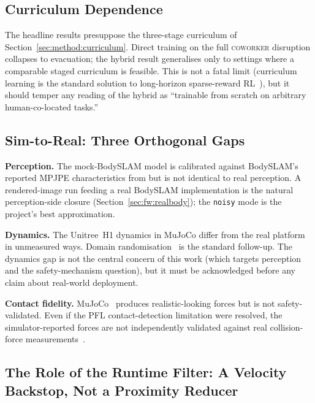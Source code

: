 \documentclass[11pt,a4paper]{report}
\newcommand{\pfl}{PFL}
\newcommand{\coworker}{\textsc{coworker}}
\newcommand{\bodyslampp}{BodySLAM\nolinebreak[4]\hspace{-.05em}\raisebox{.2ex}{\scriptsize ++}}
\begin{document}
\subsection{Curriculum Dependence}
\label{sec:disc:curriculum}

The headline results presuppose the three-stage curriculum of
Section~\ref{sec:method:curriculum}. Direct training on the full
\coworker{} disruption collapses to evacuation; the hybrid result
generalises only to settings where a comparable staged curriculum
is feasible. This is not a fatal limit (curriculum learning is
the standard solution to long-horizon sparse-reward
RL~\cite{narvekar2020curriculum,openai2019solving}), but it
should temper any reading of the hybrid as ``trainable from
scratch on arbitrary human-co-located tasks.''

\subsection{Sim-to-Real: Three Orthogonal Gaps}
\label{sec:disc:sim2real}

\textbf{Perception.} The mock-\bodyslampp{} model is calibrated
against \bodyslampp{}'s reported MPJPE characteristics from
\cite{henning2023bodyslampp} but is not identical to real
perception. A rendered-image run feeding a real \bodyslampp{}
implementation is the natural perception-side closure
(Section~\ref{sec:fw:realbody}); the \texttt{noisy} mode is the
project's best approximation.

\textbf{Dynamics.} The Unitree~H1 dynamics in MuJoCo differ from
the real platform in unmeasured ways. Domain
randomisation~\cite{tobin2017domainrand,zhao2020sim2real} is the
standard follow-up. The dynamics gap is not the central concern of
this work (which targets perception and the safety-mechanism
question), but it must be acknowledged before any claim about
real-world deployment.

\textbf{Contact fidelity.} MuJoCo~\cite{todorov2012mujoco} produces
realistic-looking forces but is not safety-validated. Even if the
\pfl{} contact-detection limitation were resolved, the
simulator-reported forces are not independently validated against
real collision-force measurements~\cite{svarny2020collision}.

\subsection{The Role of the Runtime Filter: A Velocity Backstop, Not a Proximity Reducer}
\label{sec:disc:filter-role}
\end{document}
